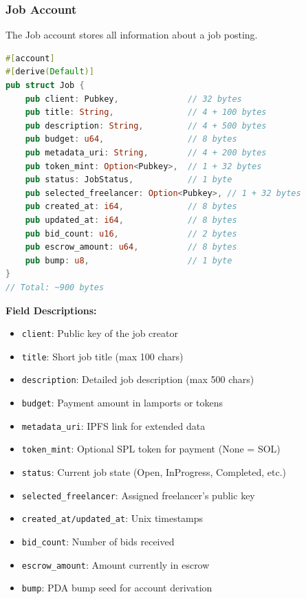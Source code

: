 \documentclass[a4paper,13pt,twoside]{report}
\theoremstyle{definition}
\begin{document}
\subsubsection{Job Account}

The Job account stores all information about a job posting.

\begin{lstlisting}[language=Rust, caption=Job Account Structure]
#[account]
#[derive(Default)]
pub struct Job {
    pub client: Pubkey,              // 32 bytes
    pub title: String,               // 4 + 100 bytes
    pub description: String,         // 4 + 500 bytes
    pub budget: u64,                 // 8 bytes
    pub metadata_uri: String,        // 4 + 200 bytes
    pub token_mint: Option<Pubkey>,  // 1 + 32 bytes
    pub status: JobStatus,           // 1 byte
    pub selected_freelancer: Option<Pubkey>, // 1 + 32 bytes
    pub created_at: i64,             // 8 bytes
    pub updated_at: i64,             // 8 bytes
    pub bid_count: u16,              // 2 bytes
    pub escrow_amount: u64,          // 8 bytes
    pub bump: u8,                    // 1 byte
}
// Total: ~900 bytes
\end{lstlisting}

\textbf{Field Descriptions:}
\begin{itemize}
    \item \texttt{client}: Public key of the job creator
    \item \texttt{title}: Short job title (max 100 chars)
    \item \texttt{description}: Detailed job description (max 500 chars)
    \item \texttt{budget}: Payment amount in lamports or tokens
    \item \texttt{metadata\_uri}: IPFS link for extended data
    \item \texttt{token\_mint}: Optional SPL token for payment (None = SOL)
    \item \texttt{status}: Current job state (Open, InProgress, Completed, etc.)
    \item \texttt{selected\_freelancer}: Assigned freelancer's public key
    \item \texttt{created\_at/updated\_at}: Unix timestamps
    \item \texttt{bid\_count}: Number of bids received
    \item \texttt{escrow\_amount}: Amount currently in escrow
    \item \texttt{bump}: PDA bump seed for account derivation
\end{itemize}
\end{document}
